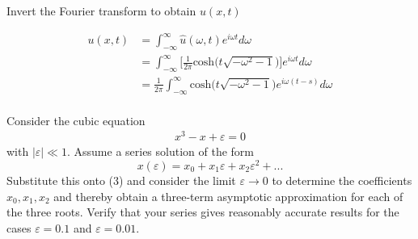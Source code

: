 \documentclass[12pt]{article}
\newcommand{\e}{\varepsilon}
\newenvironment{problem}[2][Problem]{\begin{trivlist}
  \item[\hskip \labelsep {\bfseries #1}\hskip \labelsep {\bfseries #2:}]}{\end{trivlist}}
\newenvironment{subproblem}[2][Part]{\begin{trivlist}
  \item[\hskip \labelsep {\bfseries #1}\hskip \labelsep {\bfseries (#2)}]}{\end{trivlist}}
\newenvironment{solution}[1][Solution]{\begin{trivlist}
  \item[\hskip \labelsep {\bfseries #1} \hskip \labelsep]}{\end{trivlist}}
\theoremstyle{remark}
\begin{document}
\begin{subproblem}{c}
  Invert the Fourier transform to obtain \(u(x,t)\)
\end{subproblem}
\begin{solution}
  \begin{align*}
    u(x,t) &= \int_{-\infty}^{\infty}\hat{u}(\omega,t)e^{i\omega t}d\omega \\
           &= \int_{-\infty}^{\infty}\bigg[\frac{1}{2\pi}\text{cosh}\big(t\sqrt{-\omega^2-1} \big)
             \bigg]e^{i\omega t}d\omega \\
           &= \frac{1}{2\pi}\int_{-\infty}^{\infty}\text{cosh}\big(t\sqrt{-\omega^2-1} \big)
             e^{i\omega (t-s)}d\omega \\
  \end{align*}
\end{solution}
\clearpage
\begin{problem}{5}
  Consider the cubic equation
  \begin{align}
    x^3 - x + \e = 0
  \end{align}
  with \(|\e| \ll 1\). Assume a series solution of the form
  \[
    x(\e) = x_0+x_1\e+x_2\e^2 + ...
  \]
  Substitute this onto (3) and consider the limit \(\e \rightarrow 0\) to determine the
  coefficients \(x_0,x_1,x_2\) and thereby obtain a three-term asymptotic approximation for
  each of the three roots. Verify that your series gives reasonably accurate results for the
  cases \(\e = 0.1\) and \(\e = 0.01\).
\end{problem}
\end{document}
